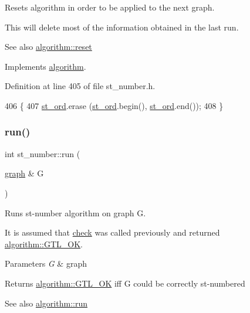 Resets algorithm in order to be applied to the next graph. 

This will delete most of the information obtained in the last run.

\begin{DoxySeeAlso}{See also}
\mbox{\hyperlink{classalgorithm_a21aba63d066ae7897de6ca7d8425c408}{algorithm\+::reset}} 
\end{DoxySeeAlso}


Implements \mbox{\hyperlink{classalgorithm_a21aba63d066ae7897de6ca7d8425c408}{algorithm}}.



Definition at line 405 of file st\+\_\+number.\+h.


\begin{DoxyCode}
406     \{
407     \mbox{\hyperlink{classst__number_af2160b5e111fe3730b4f9f3f3d09f98f}{st\_ord}}.erase (\mbox{\hyperlink{classst__number_af2160b5e111fe3730b4f9f3f3d09f98f}{st\_ord}}.begin(), \mbox{\hyperlink{classst__number_af2160b5e111fe3730b4f9f3f3d09f98f}{st\_ord}}.end());
408     \}
\end{DoxyCode}
\mbox{\label{classst__number_af902a0c05d07d47b587e8f7a6b7beaa1}} 
\subsubsection{\texorpdfstring{run()}{run()}}
{\footnotesize\ttfamily int st\+\_\+number\+::run (\begin{DoxyParamCaption}\item[{\mbox{\hyperlink{classgraph}{graph}} \&}]{G }\end{DoxyParamCaption})\hspace{0.3cm}{\ttfamily [virtual]}}



Runs st-\/number algorithm on graph {\ttfamily G}. 

It is assumed that \mbox{\hyperlink{classst__number_a2aad4550b821c52d6998bff35fd8648f}{check}} was called previously and returned \mbox{\hyperlink{classalgorithm_af1a0078e153aa99c24f9bdf0d97f6710a5114c20e4a96a76b5de9f28bf15e282b}{algorithm\+::\+G\+T\+L\+\_\+\+OK}}.


\begin{DoxyParams}{Parameters}
{\em G} & graph\\
\hline
\end{DoxyParams}
\begin{DoxyReturn}{Returns}
\mbox{\hyperlink{classalgorithm_af1a0078e153aa99c24f9bdf0d97f6710a5114c20e4a96a76b5de9f28bf15e282b}{algorithm\+::\+G\+T\+L\+\_\+\+OK}} iff {\ttfamily G} could be correctly st-\/numbered
\end{DoxyReturn}
\begin{DoxySeeAlso}{See also}
\mbox{\hyperlink{classalgorithm_a734b189509a8d6b56b65f8ff772d43ca}{algorithm\+::run}} 
\end{DoxySeeAlso}


